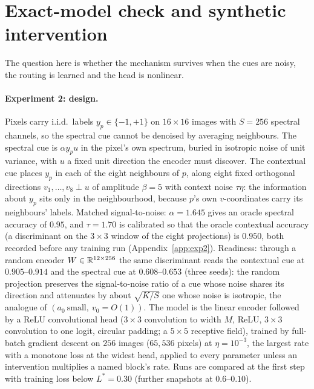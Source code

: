 \section{Exact-model check and synthetic intervention}
\label{sec:synthetic}

The question here is whether the mechanism survives when the cues are
noisy, the routing is learned and the head is nonlinear.

\paragraph{Experiment 2: design.}
Pixels carry i.i.d.\ labels $y_p\in\{-1,+1\}$ on $16\times16$ images with
$S=256$ spectral channels, so the spectral cue cannot be denoised by
averaging neighbours. The spectral cue is $\alpha y_pu$ in the pixel's own
spectrum, buried in isotropic noise of unit variance, with $u$ a fixed unit
direction the encoder must discover. The contextual cue places $y_p$ in
each of the eight neighbours of $p$, along eight fixed orthogonal
directions $v_1,\dots,v_8\perp u$ of amplitude $\beta=5$ with context noise
$\tau\eta$: the information about $y_p$ sits only in the neighbourhood,
because $p$'s own $v$-coordinates carry its neighbours' labels. Matched
signal-to-noise: $\alpha=1.645$ gives an oracle spectral accuracy of
$0.95$, and $\tau=1.70$ is calibrated so that the oracle contextual accuracy
(a discriminant on the $3\times3$ window of the eight projections)
is $0.950$, both recorded before any training run
(Appendix~\ref{app:exp2}). Readiness: through a random encoder
$W\in\mathbb{R}^{12\times256}$ the same discriminant reads the contextual cue at
$0.905$--$0.914$ and the spectral cue at $0.608$--$0.653$ (three seeds):
the random projection preserves the signal-to-noise ratio of a
cue whose noise shares its direction and attenuates by about $\sqrt{K/S}$
one whose noise is isotropic, the analogue of
$(a_0\ \text{small},\ v_0=O(1))$. The model is the
linear encoder followed by a ReLU
convolutional head ($3\times3$ convolution to width $M$, ReLU, $3\times3$
convolution to one logit, circular padding; a $5\times5$ receptive field),
trained by full-batch gradient descent on $256$ images ($65{,}536$ pixels)
at $\eta=10^{-3}$, the largest rate with a monotone loss at the widest
head, applied to every parameter unless an intervention multiplies a
named block's rate. Runs are compared at the
first step with training loss below $L^\ast=0.30$ (further snapshots at
$0.6$--$0.10$).

